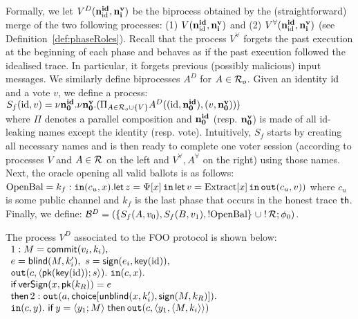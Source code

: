  
Formally, we let $V^D({\mathbf{n^{id}_{\mathrm{id}}}},{\mathbf{n^{v}_{i}}})$ be the biprocess obtained by the (straightforward) merge of the two following processes:
(1) $V({\mathbf{n^{id}_{\mathrm{id}}}},{\mathbf{n^{v}_{i}}})$ and (2) $V^\forall({\mathbf{n^{id}_{\mathrm{id}}}},{\mathbf{n^{v}_{i}}})$ (\ie see Definition~\ref{def:phaseRoles}).
Recall that the process $V^\forall$ forgets the past execution at the beginning
of each phase 
and behaves as if the past execution followed the idealised trace.
In particular, it forgets previous (possibly malicious) input messages.
We similarly define biprocesses $A^D$ for $A\in\mathcal{R}_o$.
Given an identity $\mathrm{id}$ and a vote $v$, we define a process:\\[1mm]
\null\hfill
$S_f(\mathrm{id},v)=\nu {\mathbf{n^{id}_{0}}}.\nu {\mathbf{n^{v}_{0}}}.(\Pi_{A\in\mathcal{R}_o\cup\{V\}}
A^D((\mathrm{id},{\mathbf{n^{id}_{0}}}),(v,{\mathbf{n^{v}_{0}}})))$
\hfill\null\\[1mm]
where $\Pi$ denotes a parallel composition and
${\mathbf{n^{id}_{0}}}$ (resp. ${\mathbf{n^{v}_{0}}}$) is made of all id-leaking names except the identity
(resp. vote).
Intuitively, $S_f$ starts by creating all necessary names and is then ready
to complete one voter session (according to processes $V$ and $A\in\mathcal{R}$ on the left and $V^{\forall},A^\forall$ on the right)
using those names. Next, the oracle opening all valid ballots is as follows:
$\mathrm{OpenBal}=k_f: \mathtt{in}(c_u,x).\mathsf{let}\, z=\Psi[x]\,\mathtt{in}\,\mathsf{let}\,v=\mathrm{Extract}[x]\,\mathtt{in}\,\mathtt{out}(c_u,v))$
where $c_u$ is some public channel and
$k_f$ is the last phase that occurs in the honest trace $\mathsf{th}$.
Finally, we define:
$\mathcal{B}^D=(\{S_f(A,v_0),S_f(B,v_1),!\mathrm{OpenBal}\}\;\cup\;!\,\mathcal{R};\phi_0)$.

\begin{example}
\label{ex:foo-cf}
The process $V^D$ associated to the FOO protocol is shown below:\\[0mm]
\null\hfill$
  \begin{array}[h]{lr}
    \phase{1} M = \com(v_i,k_i),&\\
              e = \bl(M,k'_i),\ s=\sign(e_i,\key(\id)), &\\
              \Out(c, \langle \pk(\key(\id)); s\rangle).\ 
              \In(c, x). \\   %
              \If\, \versign(x,\pk(k_R))=e &\\
              \Then\, \phase{2} \Out(a,\choice{\unbl(x,k'_i)}{\sign(M,k_R)}). &\\
              \In(c, y). \   %
              \If\, y=\langle y_1 ; M\rangle 
 \;             \Then\, \Out(c,\pair{y_1}{\pair{M}{k_i}}) &\\
  \end{array}
  $\hfill\null
\end{example}

